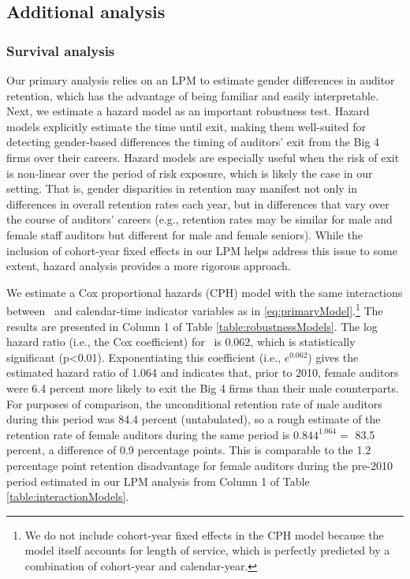 \documentclass[11pt]{article}
\begin{document}
    \subsection{Additional analysis}\label{section:robustnessTests}

        \subsubsection{Survival analysis}\label{section:survivalAnalysis}
            Our primary analysis relies on an LPM to estimate gender differences in auditor retention, which has the advantage of being familiar and easily interpretable. Next, we estimate a hazard model as an important robustness test. Hazard models explicitly estimate the time until exit, making them well-suited for detecting gender-based differences the timing of auditors' exit from the Big 4 firms over their careers. Hazard models are especially useful when the risk of exit is non-linear over the period of risk exposure, which is likely the case in our setting. That is, gender disparities in retention may manifest not only in differences in overall retention rates each year, but in differences that vary over the course of auditors' careers (e.g., retention rates may be similar for male and female staff auditors but different for male and female seniors). While the inclusion of cohort-year fixed effects in our LPM helps address this issue to some extent, hazard analysis provides a more rigorous approach. 

            We estimate a Cox proportional hazards (CPH) model \parencite{coxRegressionModelsLifeTables1972,statacorpStcoxCoxProportional2023} with the same interactions between \FEMALE\ and calendar-time indicator variables as in \ref{eq:primaryModel}.\footnote{We do not include cohort-year fixed effects in the CPH model because the model itself accounts for length of service, which is perfectly predicted by a combination of cohort-year and calendar-year.} The results are presented in Column 1 of Table \ref{table:robustnessModels}. The log hazard ratio (i.e., the Cox coefficient) for \FEMALExPREX\ is 0.062, which is statistically significant (p<0.01). Exponentiating this coefficient (i.e., $e^{0.062}$) gives the estimated hazard ratio of 1.064 and indicates that, prior to 2010, female auditors were 6.4 percent more likely to exit the Big 4 firms than their male counterparts. For purposes of comparison, the unconditional retention rate of male auditors during this period was 84.4 percent (untabulated), so a rough estimate of the retention rate of female auditors during the same period is $0.844^{1.064} =$ 83.5 percent, a difference of 0.9 percentage points. This is comparable to the 1.2 percentage point retention disadvantage for female auditors during the pre-2010 period estimated in our LPM analysis from Column 1 of Table \ref{table:interactionModels}. 
            
\end{document}

